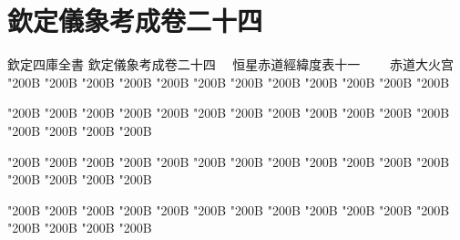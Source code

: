 \chapter*{欽定儀象考成卷二十四}
\begin{正文}
欽定四庫全書
欽定儀象考成卷二十四
　恒星赤道經緯度表十一
　　赤道大火宫
\char"200B\relax{}
\char"200B\relax{}
\char"200B\relax{}
\char"200B\relax{}
\char"200B\relax{}
\char"200B\relax{}
\char"200B\relax{}
\char"200B\relax{}
\char"200B\relax{}
\char"200B\relax{}
\char"200B\relax{}
\char"200B\relax
\par
\end{正文}\clearpage
{}
\begin{正文}
\char"200B\relax{}
\char"200B\relax{}
\char"200B\relax{}
\char"200B\relax{}
\char"200B\relax{}
\char"200B\relax{}
\char"200B\relax{}
\char"200B\relax{}
\char"200B\relax{}
\char"200B\relax{}
\char"200B\relax{}
\char"200B\relax{}
\char"200B\relax{}
\char"200B\relax{}
\char"200B\relax{}
\char"200B\relax
{}\par
\end{正文}\clearpage
{}
\begin{正文}
\char"200B\relax{}
\char"200B\relax{}
\char"200B\relax{}
\char"200B\relax{}
\char"200B\relax{}
\char"200B\relax{}
\char"200B\relax{}
\char"200B\relax{}
\char"200B\relax{}
\char"200B\relax{}
\char"200B\relax{}
\char"200B\relax{}
\char"200B\relax{}
\char"200B\relax{}
\char"200B\relax{}
\char"200B\relax
{}\par
\end{正文}\clearpage
{}
\begin{正文}
\char"200B\relax{}
\char"200B\relax{}
\char"200B\relax{}
\char"200B\relax{}
\char"200B\relax{}
\char"200B\relax{}
\char"200B\relax{}
\char"200B\relax{}
\char"200B\relax{}
\char"200B\relax{}
\char"200B\relax{}
\char"200B\relax{}
\char"200B\relax{}
\char"200B\relax{}
\char"200B\relax{}
\char"200B\relax
{}\par
\end{正文}\clearpage

